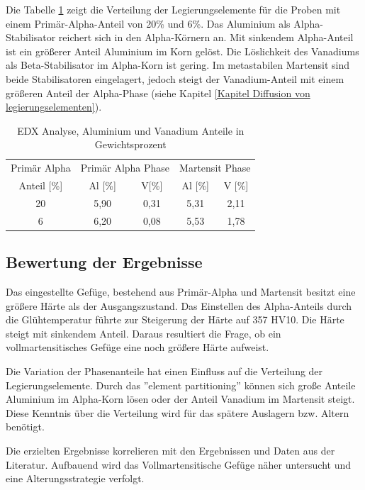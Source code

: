 \documentclass[a4paper, 11pt]{tubsreprt}
\begin{document}
Die Tabelle \ref{Tabelle EDX Analyse} zeigt die Verteilung der Legierungselemente für die Proben mit einem Primär-Alpha-Anteil von 20\% und 6\%. Das Aluminium als Alpha-Stabilisator reichert sich in den Alpha-Körnern an. Mit sinkendem Alpha-Anteil ist ein größerer Anteil Aluminium im Korn gelöst. Die Löslichkeit des Vanadiums als Beta-Stabilisator im Alpha-Korn ist gering. Im metastabilen Martensit sind beide Stabilisatoren eingelagert, jedoch steigt der Vanadium-Anteil mit einem größeren Anteil der Alpha-Phase (siehe Kapitel \ref{Kapitel Diffusion von legierungselementen}).    
\begin{table}
\begin{tabular}{c|c|c|c|c}
Primär Alpha & \multicolumn{2}{c}{Primär Alpha Phase} & \multicolumn{2}{|c}{Martensit Phase} \\
\cline{2-5}
Anteil [\%] & Al [\%] & V[\%] & Al [\%] & V [\%] \\
\hline
20 & 5,90 & 0,31 & 5,31 & 2,11 \\
\hline
6 & 6,20 & 0,08 & 5,53 & 1,78 \\

\end{tabular}
\caption{EDX Analyse, Aluminium und Vanadium Anteile in Gewichtsprozent}
\label{Tabelle EDX Analyse}
\end{table}
\subsection{Bewertung der Ergebnisse}
Das eingestellte Gefüge, bestehend aus Primär-Alpha und Martensit besitzt eine größere Härte als der Ausgangszustand. Das Einstellen des Alpha-Anteils durch die Glühtemperatur führte zur Steigerung der Härte auf 357 HV10. Die Härte steigt mit sinkendem Anteil. Daraus resultiert die Frage, ob ein vollmartensitisches Gefüge eine noch größere Härte aufweist.

Die Variation der Phasenanteile hat einen Einfluss auf die Verteilung der Legierungselemente. Durch das ''element partitioning'' können sich große Anteile Aluminium im Alpha-Korn lösen oder der Anteil Vanadium im Martensit steigt. Diese Kenntnis über die Verteilung wird für das spätere Auslagern bzw. Altern benötigt. 

Die erzielten Ergebnisse korrelieren mit den Ergebnissen und Daten aus der Literatur. Aufbauend wird das Vollmartensitische Gefüge näher untersucht und eine Alterungsstrategie verfolgt.   
\end{document}
